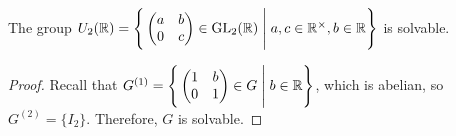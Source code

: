\begin{example}
  The group \(U_2(\mathbb{R}) = \Bigg\{
      \begin{pmatrix}
        a & b \\
        0 & c
      \end{pmatrix} \in \operatorname{GL}_2(\mathbb{R}) \Biggm| a, c \in \mathbb{R}^\times, b \in \mathbb{R}
    \Bigg\}\) is solvable.
\end{example}
\begin{proof}
  Recall that \(G^{(1)} = \Bigg\{
      \begin{pmatrix}
        1 & b \\
        0 & 1
      \end{pmatrix} \in G \Biggm| b \in \mathbb{R}
    \Bigg\}\), which is abelian, so \(G^{(2)} = \{I_2\}\).
    Therefore, \(G\) is solvable.
\end{proof}